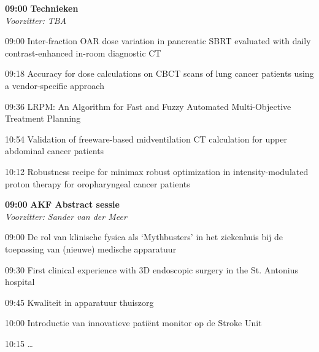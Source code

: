 \documentclass[a4paper,10pt]{report}
\begin{document}
\begin{multicols*}{3}

\begin{packed_enum}
\item[\textbf{09:00}]{\textbf{Technieken}}\\\textit{Voorzitter: TBA}
\item[09:00] Inter-fraction OAR dose variation in pancreatic SBRT evaluated with daily contrast-enhanced in-room diagnostic CT
\item[09:18] Accuracy for dose calculations on CBCT scans of lung cancer patients using a vendor-specific approach
\item[09:36] LRPM: An Algorithm for Fast and Fuzzy Automated Multi-Objective Treatment Planning
\item[10:54] Validation of freeware-based midventilation CT calculation for upper abdominal cancer patients
\item[10:12] Robustness recipe for minimax robust optimization in intensity-modulated proton therapy for oropharyngeal cancer patients
\end{packed_enum} %


\begin{packed_enum}
\item[\textbf{09:00}] \textbf{AKF Abstract sessie}\\\textit{Voorzitter: Sander van der Meer}
\item[09:00] De rol van klinische fysica als ‘Mythbusters’ in het ziekenhuis bij de toepassing van (nieuwe) medische apparatuur
\item[09:30] First clinical experience with 3D endoscopic surgery in the St. Antonius hospital
\item[09:45] Kwaliteit in apparatuur thuiszorg
\item[10:00] Introductie van innovatieve patiënt monitor op de Stroke Unit
\item[10:15] \ldots\itemauthor{\ldots}
\end{packed_enum} %

\end{multicols*}
\end{document}
